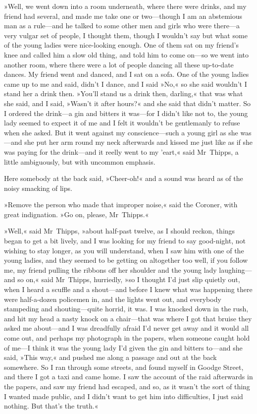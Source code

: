 »Well, we went down into a room underneath, where there were drinks, and my friend had several, and made me take one or two—though I am an abstemious man as a rule—and he talked to some other men and girls who were there—a very vulgar set of people, I thought them, though I wouldn't say but what some of the young ladies were nice-looking enough. One of them sat on my friend's knee and called him a slow old thing, and told him to come on—so we went into another room, where there were a lot of people dancing all these up-to-date dances. My friend went and danced, and I sat on a sofa. One of the young ladies came up to me and said, didn't I dance, and I said »No,« so she said wouldn't I stand her a drink then. »You'll stand us a drink then, darling,« that was what she said, and I said, »Wasn't it after hours?« and she said that didn't matter. So I ordered the drink—a gin and bitters it was—for I didn't like not to, the young lady seemed to expect it of me and I felt it wouldn't be gentlemanly to refuse when she asked. But it went against my conscience—such a young girl as she was—and she put her arm round my neck afterwards and kissed me just like as if she was paying for the drink—and it reelly went to my 'eart,« said Mr~Thipps, a little ambiguously, but with uncommon emphasis.

Here somebody at the back said, »Cheer-oh!« and a sound was heard as of the noisy smacking of lips.

»Remove the person who made that improper noise,« said the Coroner, with great indignation. »Go on, please, Mr~Thipps.«

»Well,« said Mr~Thipps, »about half-past twelve, as I should reckon, things began to get a bit lively, and I was looking for my friend to say good-night, not wishing to stay longer, as you will understand, when I saw him with one of the young ladies, and they seemed to be getting on altogether too well, if you follow me, my friend pulling the ribbons off her shoulder and the young lady laughing—and so on,« said Mr~Thipps, hurriedly, »so I thought I'd just slip quietly out, when I heard a scuffle and a shout—and before I knew what was happening there were half-a-dozen policemen in, and the lights went out, and everybody stampeding and shouting—quite horrid, it was. I was knocked down in the rush, and hit my head a nasty knock on a chair—that was where I got that bruise they asked me about—and I was dreadfully afraid I'd never get away and it would all come out, and perhaps my photograph in the papers, when someone caught hold of me—I think it was the young lady I'd given the gin and bitters to—and she said, »This way,« and pushed me along a passage and out at the back somewhere. So I ran through some streets, and found myself in Goodge Street, and there I got a taxi and came home. I saw the account of the raid afterwards in the papers, and saw my friend had escaped, and so, as it wasn't the sort of thing I wanted made public, and I didn't want to get him into difficulties, I just said nothing. But that's the truth.«

